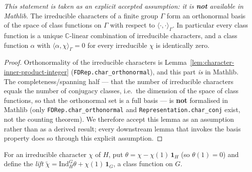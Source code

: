 \begin{lemma}
    \label{lem:irr-characters-orthonormal-basis}
    \emph{This statement is taken as an explicit accepted assumption: it is
    \textbf{not} available in Mathlib.} The irreducible characters of a finite
    group $\Gamma$ form an orthonormal basis of the space of class functions on
    $\Gamma$ with respect to $\langle\cdot,\cdot\rangle_\Gamma$. In particular
    every class function is a unique $\mathbb{C}$-linear combination of irreducible
    characters, and a class function $\alpha$ with $\langle \alpha,
    \chi\rangle_\Gamma = 0$ for every irreducible $\chi$ is identically zero.
\end{lemma}
\begin{proof}
    Orthonormality of the irreducible characters is
    Lemma~\ref{lem:character-inner-product-integer}
    (\texttt{FDRep.char\_orthonormal}), and this part \emph{is} in Mathlib. The
    completeness/spanning half — that the number of irreducible characters equals
    the number of conjugacy classes, i.e.\ the dimension of the space of class
    functions, so that the orthonormal set is a full basis — is \textbf{not}
    formalised in Mathlib (only \texttt{FDRep.char\_orthonormal} and
    \texttt{Representation.char\_conj} exist, not the counting theorem). We
    therefore accept this lemma as an assumption rather than as a derived result;
    every downstream lemma that invokes the basis property does so through this
    explicit assumption.
\end{proof}

\begin{definition}
    \label{def:lifted-class-function}
    \leanok
    For an irreducible character $\chi$ of $H$, put
    $\theta = \chi - \chi(1)\,\mathbf{1}_H$ (so $\theta(1) = 0$) and define the
    \emph{lift}
    $\widetilde{\chi} = \mathrm{Ind}_H^G \theta + \chi(1)\,\mathbf{1}_G$,
    a class function on $G$.
\end{definition}

